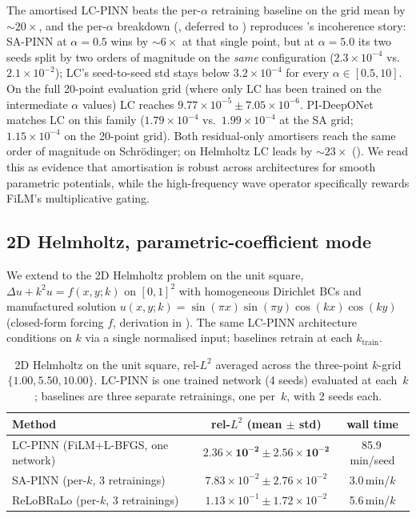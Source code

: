 \documentclass{article}
\theoremstyle{plain}
\theoremstyle{definition}
\theoremstyle{remark}
\begin{document}
The amortised LC-PINN beats the per-$\alpha$ retraining baseline on
the grid mean by $\sim\!20\times$, and the per-$\alpha$ breakdown
(, deferred to
) reproduces 's
incoherence story: SA-PINN at $\alpha\!=\!0.5$ wins by $\sim\!6\times$
at that single point, but at $\alpha\!=\!5.0$ its two seeds split by
two orders of magnitude on the \emph{same} configuration
($2.3\!\times\!10^{-4}$ vs.\ $2.1\!\times\!10^{-2}$); LC's seed-to-seed
std stays below $3.2\!\times\!10^{-4}$ for every $\alpha\!\in\![0.5,10]$.
On the full 20-point evaluation grid (where only LC has been trained
on the intermediate $\alpha$ values) LC reaches
$9.77\!\times\!10^{-5} \pm 7.05\!\times\!10^{-6}$.
PI-DeepONet matches LC on this family ($1.79\!\times\!10^{-4}$ vs.\
$1.99\!\times\!10^{-4}$ at the SA grid; $1.15\!\times\!10^{-4}$ on
the 20-point grid). Both residual-only amortisers reach the same
order of magnitude on Schrödinger; on Helmholtz LC leads by
$\sim\!23\times$ (). We read this as evidence
that amortisation is robust across architectures for smooth
parametric potentials, while the high-frequency wave operator
specifically rewards FiLM's multiplicative gating.

\subsection{2D Helmholtz, parametric-coefficient mode}
\label{sec:results-helmholtz-2d}

We extend to the 2D Helmholtz problem on the unit square,
$\Delta u + k^2 u = f(x, y; k)$ on $[0,1]^2$ with homogeneous
Dirichlet BCs and manufactured solution
$u(x, y; k) = \sin(\pi x)\sin(\pi y)\cos(kx)\cos(ky)$ (closed-form
forcing $f$, derivation in \Cref{sec:appendix-hyper}). The same
LC-PINN architecture conditions on $k$ via a single normalised
input; baselines retrain at each $k_{\text{train}}$.

\begin{table}[h]
\centering
\caption{2D Helmholtz on the unit square, rel-$L^2$ averaged
across the three-point $k$-grid $\{1.00, 5.50, 10.00\}$.
LC-PINN is one trained network (4 seeds) evaluated at each~$k$;
baselines are three separate retrainings, one per~$k$, with 2 seeds
each.}
\label{tab:helmholtz-2d}
\begin{tabular}{lcc}
\toprule
Method & rel-$L^2$ (mean $\pm$ std) & wall time \\
\midrule
LC-PINN (FiLM+L-BFGS, one network) & $\mathbf{2.36 \times 10^{-2} \pm 2.56 \times 10^{-2}}$ & 85.9\,min/seed \\
SA-PINN (per-$k$, 3 retrainings)   & $7.83 \times 10^{-2} \pm 2.76 \times 10^{-2}$ & 3.0\,min/$k$ \\
ReLoBRaLo (per-$k$, 3 retrainings) & $1.13 \times 10^{-1} \pm 1.72 \times 10^{-2}$ & 5.6\,min/$k$ \\
\bottomrule
\end{tabular}
\end{table}
\end{document}
